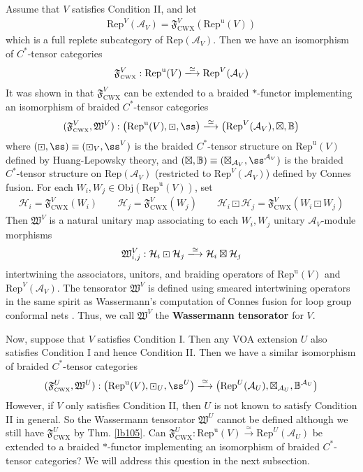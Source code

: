 \documentclass[11pt,b5paper,notitlepage]{article}
\theoremstyle{definition}
\theoremstyle{plain}
\newcommand{\fk}{\mathfrak}
\newcommand{\mc}{\mathcal}
\newcommand{\Rep}{\mathrm{Rep}}
\newcommand{\uni}{\mathrm{u}}
\newcommand{\RepV}{{\mathrm{Rep}^\uni(V)}}
\newcommand{\Obj}{\mathrm{Obj}}
\newcommand{\CWX}{{\scriptscriptstyle \mathrm{CWX}}}
\numberwithin{equation}{section}
\begin{document}
Assume that $V$ satisfies Condition II, and let 
\begin{align}
\Rep^V(\mc A_V)=\fk F_\CWX^V(\RepV)
\end{align}
which is a full replete subcategory of $\Rep(\mc A_V)$. Then we have an isomorphism of $C^*$-tensor categories
\begin{align}
\fk F_\CWX^V:\RepV\xlongrightarrow{\simeq}\Rep^V(\mc A_V)
\end{align}
It was shown in \cite{Gui20} that $\fk F_\CWX^V$ can be extended to a braided $*$-functor implementing an isomorphism of braided $C^*$-tensor categories
\begin{align}\label{eq95}
(\fk F^V_\CWX,\fk W^V): \big(\RepV,\boxdot,\ss\big)\xlongrightarrow{\simeq}\big(\Rep^V(\mc A_V),\boxtimes,\mathbb B\big)
\end{align}
where $(\boxdot,\ss)\equiv(\boxdot_V,\ss^V)$ is the braided $C^*$-tensor structure on $\RepV$ defined by Huang-Lepowsky theory, and $(\boxtimes,\mathbb B)\equiv(\boxtimes_{\mc A_V},\ss^{\mc A_V})$ is the braided $C^*$-tensor structure on $\Rep(\mc A_V)$ (restricted to $\Rep^V(\mc A_V)$) defined by Connes fusion. For each $W_i,W_j\in\Obj(\RepV)$, set
\begin{align*}
\mc H_i=\fk F_\CWX^V(W_i)\qquad \mc H_j=\fk F_\CWX^V(W_j)\qquad \mc H_i\boxdot\mc H_j=\fk F_\CWX^V(W_i\boxdot W_j)
\end{align*}
Then $\fk W^V$ is a natural unitary map associating to each $W_i,W_j$ unitary $\mc A_V$-module morphisms
\begin{align*}
\fk W^V_{i,j}:\mc H_i\boxdot\mc H_j\xlongrightarrow{\simeq}\mc H_i\boxtimes\mc H_j
\end{align*}
intertwining the associators, unitors, and braiding operators of $\RepV$ and $\Rep^V(\mc A_V)$. The tensorator $\fk W^V$ is defined using smeared intertwining operators in the same spirit as Wassermann's computation of Connes fusion for loop group conformal nets \cite{Was98}. Thus, we call $\fk W^V$ the \textbf{Wassermann tensorator} for $V$. 




Now, suppose that $V$ satisfies Condition I. Then any VOA extension $U$ also satisfies Condition I and hence Condition II. Then we have a similar isomorphism of braided $C^*$-tensor categories
\begin{align*}
(\fk F^U_\CWX,\fk W^U): \big(\RepV,\boxdot_U,\ss^U\big)\xlongrightarrow{\simeq}\big(\Rep^U(\mc A_U),\boxtimes_{\mc A_U},\mathbb B^{\mc A_U}\big)
\end{align*}
However, if $V$ only satisfies Condition II, then $U$ is not known to satisfy Condition II in general. So the Wassermann tensorator $\fk W^U$ cannot be defined although we still have $\fk F^U_\CWX$ by Thm. \ref{lb105}. Can $\fk F_\CWX^U:\RepV\xrightarrow{\simeq}\Rep^U(\mc A_U)$ be extended to a braided $*$-functor implementing an isomorphism of braided $C^*$-tensor categories? We will address this question in the next subsection. 
\end{document}
